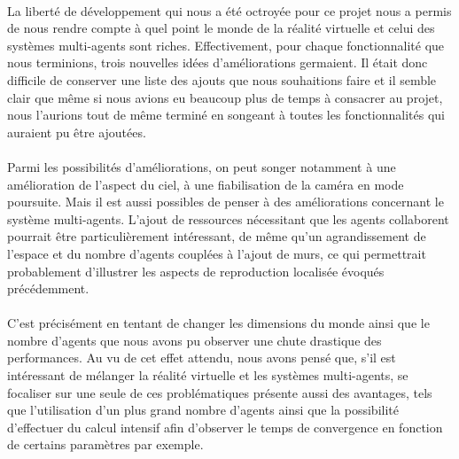 \paragraph{}
La liberté de développement qui nous a été octroyée pour ce projet nous a
permis de nous rendre compte à quel point le monde de la réalité virtuelle et
celui des systèmes multi-agents sont riches. Effectivement, pour chaque
fonctionnalité que nous terminions, trois nouvelles idées d'améliorations
germaient. Il était donc difficile de conserver une liste des ajouts que nous
souhaitions faire et il semble clair que même si nous avions eu beaucoup plus
de temps à consacrer au projet, nous l'aurions tout de même terminé en
songeant à toutes les fonctionnalités qui auraient pu être ajoutées.

\paragraph{}
Parmi les possibilités d'améliorations, on peut songer notamment à une
amélioration de l'aspect du ciel, à une fiabilisation de la caméra en mode
poursuite. Mais il est aussi possibles de penser à des améliorations
concernant le système multi-agents. L'ajout de ressources nécessitant que les
agents collaborent pourrait être particulièrement intéressant, de même qu'un
agrandissement de l'espace et du nombre d'agents couplées à l'ajout de murs,
ce qui permettrait probablement d'illustrer les aspects de reproduction
localisée évoqués précédemment.

\paragraph{}
C'est précisément en tentant de changer les dimensions du monde ainsi que le
nombre d'agents que nous avons pu observer une chute drastique des
performances. Au vu de cet effet attendu, nous avons pensé que, s'il est
intéressant de mélanger la réalité virtuelle et les systèmes multi-agents, se
focaliser sur une seule de ces problématiques présente aussi des avantages,
tels que l'utilisation d'un plus grand nombre d'agents ainsi que la
possibilité d'effectuer du calcul intensif afin d'observer le temps de
convergence en fonction de certains paramètres par exemple.

